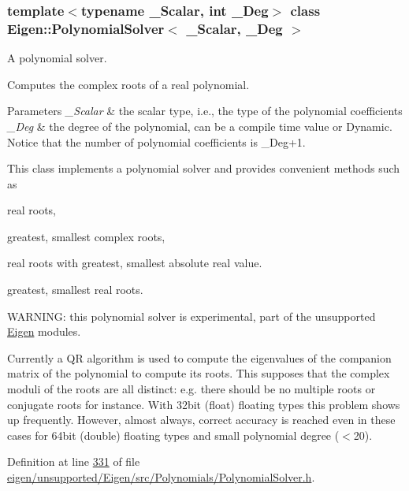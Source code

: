 \subsubsection*{template$<$typename \+\_\+\+Scalar, int \+\_\+\+Deg$>$\newline
class Eigen\+::\+Polynomial\+Solver$<$ \+\_\+\+Scalar, \+\_\+\+Deg $>$}

A polynomial solver. 

Computes the complex roots of a real polynomial.


\begin{DoxyParams}{Parameters}
{\em \+\_\+\+Scalar} & the scalar type, i.\+e., the type of the polynomial coefficients \\
\hline
{\em \+\_\+\+Deg} & the degree of the polynomial, can be a compile time value or Dynamic. Notice that the number of polynomial coefficients is \+\_\+\+Deg+1.\\
\hline
\end{DoxyParams}
This class implements a polynomial solver and provides convenient methods such as
\begin{DoxyItemize}
\item real roots,
\item greatest, smallest complex roots,
\item real roots with greatest, smallest absolute real value.
\item greatest, smallest real roots.
\end{DoxyItemize}

W\+A\+R\+N\+I\+NG\+: this polynomial solver is experimental, part of the unsupported \hyperlink{namespace_eigen}{Eigen} modules.

Currently a QR algorithm is used to compute the eigenvalues of the companion matrix of the polynomial to compute its roots. This supposes that the complex moduli of the roots are all distinct\+: e.\+g. there should be no multiple roots or conjugate roots for instance. With 32bit (float) floating types this problem shows up frequently. However, almost always, correct accuracy is reached even in these cases for 64bit (double) floating types and small polynomial degree ($<$20). 

Definition at line \hyperlink{eigen_2unsupported_2_eigen_2src_2_polynomials_2_polynomial_solver_8h_source_l00331}{331} of file \hyperlink{eigen_2unsupported_2_eigen_2src_2_polynomials_2_polynomial_solver_8h_source}{eigen/unsupported/\+Eigen/src/\+Polynomials/\+Polynomial\+Solver.\+h}.



